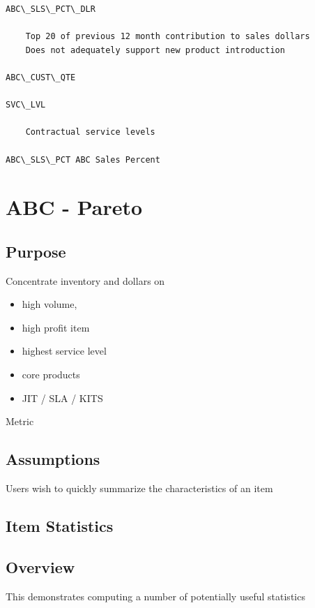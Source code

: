 \documentclass[letterpaper,10pt,english]{sphinxmanual}
\begin{document}
\begin{Verbatim}[commandchars=\\\{\}]
ABC\_SLS\_PCT\_DLR

    Top 20 of previous 12 month contribution to sales dollars
    Does not adequately support new product introduction

ABC\_CUST\_QTE

SVC\_LVL

    Contractual service levels

ABC\_SLS\_PCT ABC Sales Percent
\end{Verbatim}


\chapter{ABC - Pareto}
\label{Portal/100-ABC::doc}\label{Portal/100-ABC:abc-pareto}

\section{Purpose}
\label{Portal/100-ABC:purpose}
Concentrate inventory and dollars on
\begin{itemize}
\item {} 
high volume,

\item {} 
high profit item

\item {} 
highest service level

\item {} 
core products

\item {} 
JIT / SLA / KITS

\end{itemize}

Metric


\section{Assumptions}
\label{Portal/100-ABC:assumptions}
Users wish to quickly summarize the characteristics of an item


\section{Item Statistics}
\label{Portal/100-ABC:item-statistics}

\section{Overview}
\label{Portal/100-ABC:overview}
This demonstrates computing a number of potentially useful statistics
\end{document}
